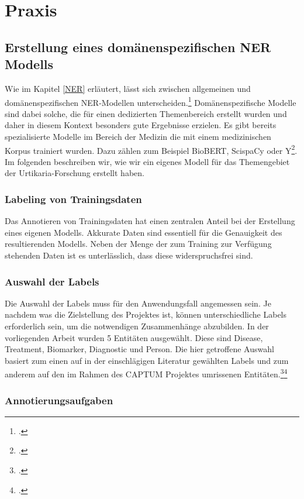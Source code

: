 \newpage
\section{Praxis} \label{latexDetails}
\subsection{Erstellung eines domänenspezifischen NER Modells}
Wie im Kapitel \ref{NER} erläutert, lässt sich zwischen allgemeinen und domänenspezifischen \ac{NER}-Modellen unterscheiden.\footcite[vgl.][S.47]{nouvel2016} Domänenspezifische Modelle sind dabei solche, die für einen dedizierten Themenbereich erstellt wurden und daher in diesem Kontext besonders gute Ergebnisse erzielen.
Es gibt bereits spezialisierte Modelle im Bereich der Medizin die mit einem medizinischen Korpus trainiert wurden. Dazu zählen zum Beispiel BioBERT, ScispaCy oder Y\footcite[S.12]{li2020}. Im folgenden beschreiben wir, wie wir ein eigenes Modell für das Themengebiet der Urtikaria-Forschung erstellt haben.
\subsubsection{Labeling von Trainingsdaten}
Das Annotieren von Trainingsdaten hat einen zentralen Anteil bei der Erstellung eines eigenen Modells. Akkurate Daten sind essentiell für die Genauigkeit des resultierenden Modells. Neben der Menge der zum Training zur Verfügung stehenden Daten ist es unterlässlich, dass diese widerspruchsfrei sind.

\subsubsection{Auswahl der Labels}
Die Auswahl der Labels muss für den Anwendungsfall angemessen sein. Je nachdem was die Zielstellung des Projektes ist, können unterschiedliche Labels erforderlich sein, um die notwendigen Zusammenhänge abzubilden.
In der vorliegenden Arbeit wurden 5 Entitäten ausgewählt. Diese sind Disease, Treatment, Biomarker, Diagnostic und Person. Die hier getroffene Auswahl basiert zum einen auf in der einschlägigen Literatur gewählten Labels und zum anderem auf den im Rahmen des CAPTUM Projektes umrissenen Entitäten.\footcite[vgl.][S.]{li2016}\footcite[vgl.][S.]{eickhoff2020}

\subsubsection{Annotierungsaufgaben}

